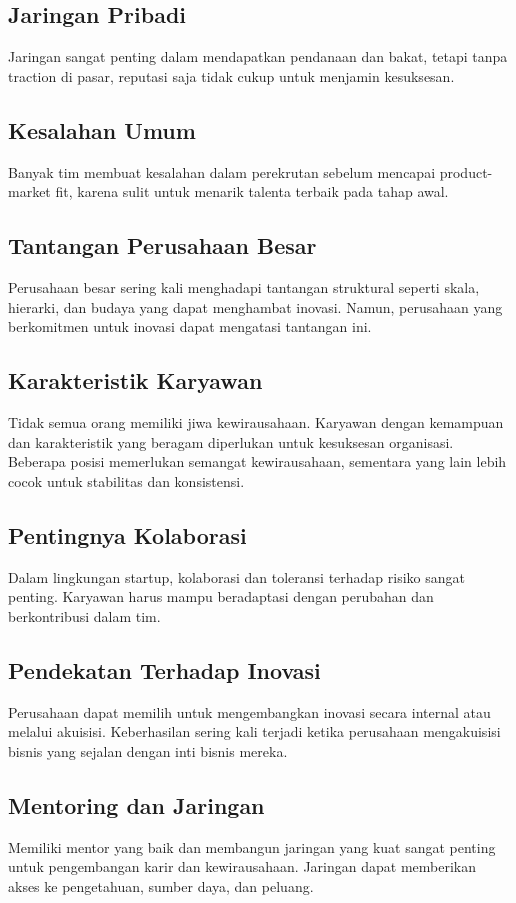 \documentclass{article}
\begin{document}
\subsection{Jaringan Pribadi}
Jaringan sangat penting dalam mendapatkan pendanaan dan bakat, tetapi tanpa traction di pasar, reputasi saja tidak cukup untuk menjamin kesuksesan.

\subsection{Kesalahan Umum}
Banyak tim membuat kesalahan dalam perekrutan sebelum mencapai product-market fit, karena sulit untuk menarik talenta terbaik pada tahap awal.

\subsection{Tantangan Perusahaan Besar}
Perusahaan besar sering kali menghadapi tantangan struktural seperti skala, hierarki, dan budaya yang dapat menghambat inovasi. Namun, perusahaan yang berkomitmen untuk inovasi dapat mengatasi tantangan ini.

\subsection{Karakteristik Karyawan}
Tidak semua orang memiliki jiwa kewirausahaan. Karyawan dengan kemampuan dan karakteristik yang beragam diperlukan untuk kesuksesan organisasi. Beberapa posisi memerlukan semangat kewirausahaan, sementara yang lain lebih cocok untuk stabilitas dan konsistensi.

\subsection{Pentingnya Kolaborasi}
Dalam lingkungan startup, kolaborasi dan toleransi terhadap risiko sangat penting. Karyawan harus mampu beradaptasi dengan perubahan dan berkontribusi dalam tim.

\subsection{Pendekatan Terhadap Inovasi}
Perusahaan dapat memilih untuk mengembangkan inovasi secara internal atau melalui akuisisi. Keberhasilan sering kali terjadi ketika perusahaan mengakuisisi bisnis yang sejalan dengan inti bisnis mereka.

\subsection{Mentoring dan Jaringan}
Memiliki mentor yang baik dan membangun jaringan yang kuat sangat penting untuk pengembangan karir dan kewirausahaan. Jaringan dapat memberikan akses ke pengetahuan, sumber daya, dan peluang.
\end{document}
